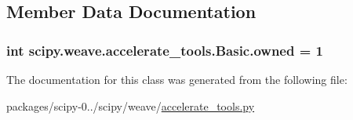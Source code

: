 \subsection{Member Data Documentation}
\hypertarget{classscipy_1_1weave_1_1accelerate__tools_1_1Basic_a0fd23dd1de655829b8a5cc5aefbcd76d}{}
\subsubsection[{owned}]{\setlength{\rightskip}{0pt plus 5cm}int scipy.\+weave.\+accelerate\+\_\+tools.\+Basic.\+owned = 1\hspace{0.3cm}{\ttfamily [static]}}\label{classscipy_1_1weave_1_1accelerate__tools_1_1Basic_a0fd23dd1de655829b8a5cc5aefbcd76d}


The documentation for this class was generated from the following file\+:\begin{DoxyCompactItemize}
\item 
packages/scipy-\/0../scipy/weave/\hyperlink{accelerate__tools_8py}{accelerate\+\_\+tools.\+py}\end{DoxyCompactItemize}
